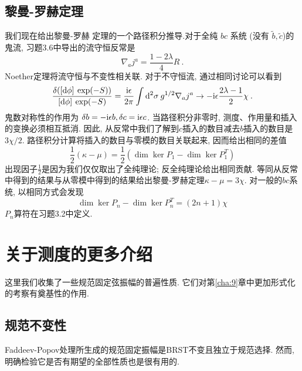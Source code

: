 \subsection*{黎曼-罗赫定理}
我们现在给出黎曼-罗赫 定理的一个路径积分推导.对于全纯 $b c$ 系统 (没有 $\tilde{b}, \tilde{c}$)的鬼流, 习题3.6中导出的流守恒反常是
\begin{equation}
	\nabla_{a} j^{a}=\frac{1-2 \lambda}{4} R \:. \label{5.3.19}
\end{equation}
Noether定理将流守恒与不变性相关联. 对于不守恒流, 通过相同讨论可以看到
\begin{equation}
	\frac{\delta([\mathrm{d} \phi]\: \exp (-S))}{[\mathrm{d} \phi] \:\exp (-S)}=\frac{\mathrm{i} \epsilon}{2 \pi} \int \mathrm{d}^{2} \sigma \: g^{1 / 2} \nabla_{a} j^{a} \rightarrow-\mathrm{i} \epsilon \frac{2 \lambda-1}{2} \chi \:. \label{5.3.20}
\end{equation}
鬼数对称性的作用为 $\delta b=-\mathrm{i} \epsilon b, \delta c=\mathrm{i} \epsilon c $.  当路径积分非零时, 测度、作用量和插入的变换必须相互抵消. 
因此, 从反常中我们了解到$c$插入的数目减去$b$插入的数目是$3 \chi / 2 $.  路径积分计算将插入的数目与零模的数目关联起来, 因而给出相同的差值
\begin{equation}
	\frac{1}{2}(\kappa-\mu)=\frac{1}{2}(\operatorname{dim} \operatorname{ker} P_{1}-\operatorname{dim} \operatorname{ker} P_{1}^{T}) 
	\label{5.3.21}
\end{equation}
出现因子$\frac{1}{2}$是因为我们仅仅取出了全纯理论; 反全纯理论给出相同贡献. 等同从反常中得到的结果与从零模中得到的结果给出黎曼-罗赫定理$\kappa-\mu=3 \chi$. 
对一般的$b c$系统, 以相同方式会发现
\begin{equation}
	\operatorname{dim} \operatorname{ker} P_{n}-\operatorname{dim} \operatorname{ker} P_{n}^{T}=(2 n+1) \chi \label{5.3.22}
\end{equation}
$P_{n}$算符在习题3.2中定义.

\section{\texorpdfstring{关于测度的更多介绍}{5.4 More about the measure}}

这里我们收集了一些规范固定弦振幅的普遍性质. 它们对第\ref{cha:9}章中更加形式化的考察有奠基性的作用.

\subsection*{规范不变性}
Faddeev-Popov处理所生成的规范固定振幅是BRST不变且独立于规范选择. 然而, 明确检验它是否有期望的全部性质也是很有用的. 

